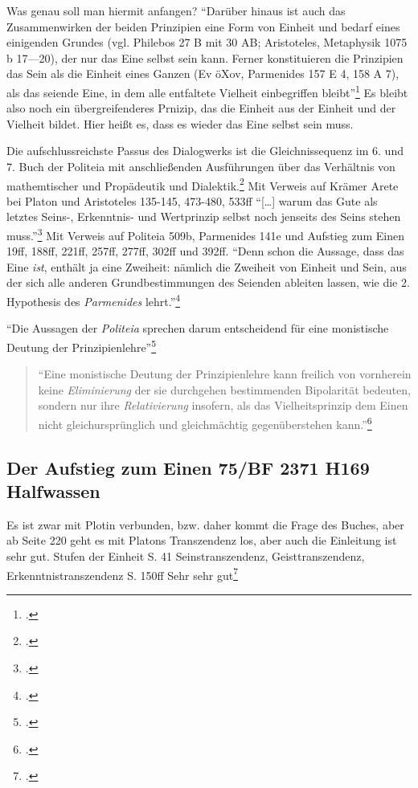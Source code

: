 \documentclass[12pt]{article}
\newcommand*{\zitatblock}[1]{%
    \begin{quote}
    \fontsize{10}{12}\selectfont
    \setlength{\parskip}{1.0em}
    #1
    \end{quote}
}
\begin{document}
Was genau soll man hiermit anfangen? \enquote{Darüber hinaus ist auch das Zusammenwirken der beiden Prinzipien eine Form von Einheit und bedarf eines einigenden Grundes (vgl. Philebos 27 B mit 30 AB; Aristoteles, Metaphysik 1075 b 17—20), der nur das Eine selbst sein kann. Ferner konstituieren die Prinzipien das Sein als die Einheit eines Ganzen (Ev öXov, Parmenides 157 E 4, 158 A 7), als das seiende Eine, in dem alle entfaltete Vielheit einbegriffen bleibt}\footcite[][S. 106]{halfwassen2015spuren}
Es bleibt also noch ein übergreifenderes Prnizip, das die Einheit aus der Einheit und der Vielheit bildet. Hier heißt es, dass es wieder das Eine selbst sein muss.

Die aufschlussreichste Passus des Dialogwerks ist die Gleichnissequenz im 6. und 7. Buch der Politeia mit anschließenden Ausführungen über das Verhältnis von mathemtischer und Propädeutik und Dialektik.\footcite[vgl.][S. 135]{halfwassen2015spuren} Mit Verweis auf Krämer Arete bei Platon und Aristoteles 135-145, 473-480, 533ff
\enquote{[\dots] warum das Gute als letztes Seins-, Erkenntnis- und Wertprinzip selbst noch jenseits des Seins stehen muss.}\footcite[vgl.][S. 136]{halfwassen2015spuren} Mit Verweis auf Politeia 509b, Parmenides 141e und Aufstieg zum Einen 19ff, 188ff, 221ff, 257ff, 277ff, 302ff und 392ff. 
\enquote{Denn schon die Aussage, dass das Eine \emph{ist}, enthält ja eine Zweiheit: nämlich die Zweiheit von Einheit und Sein, aus der sich alle anderen Grundbestimmungen des Seienden ableiten lassen, wie die 2. Hypothesis des \emph{Parmenides} lehrt.}\footcite[][S. 136f.]{halfwassen2015spuren}

\enquote{Die Aussagen der \emph{Politeia} sprechen darum entscheidend für eine monistische Deutung der Prinzipienlehre}\footcite[][S. 137]{halfwassen2015spuren}
\zitatblock{\enquote{Eine monistische Deutung der Prinzipienlehre kann freilich von vornherein keine \emph{Eliminierung} der sie durchgehen bestimmenden Bipolarität bedeuten, sondern nur ihre \emph{Relativierung} insofern, als das Vielheitsprinzip dem Einen nicht gleichursprünglich und gleichmächtig gegenüberstehen kann.}\footcite[][S. 138]{halfwassen2015spuren}}


\subsection*{Der Aufstieg zum Einen 75/BF 2371 H169 Halfwassen}
Es ist zwar mit Plotin verbunden, bzw. daher kommt die Frage des Buches, aber ab Seite 220 geht es mit Platons Transzendenz los, aber auch die Einleitung ist sehr gut.
Stufen der Einheit S. 41
Seinstranszendenz, Geisttranszendenz, Erkenntnistranszendenz S. 150ff
Sehr sehr gut\footcite[][]{halfwassenaufstieg2006}
\end{document}
